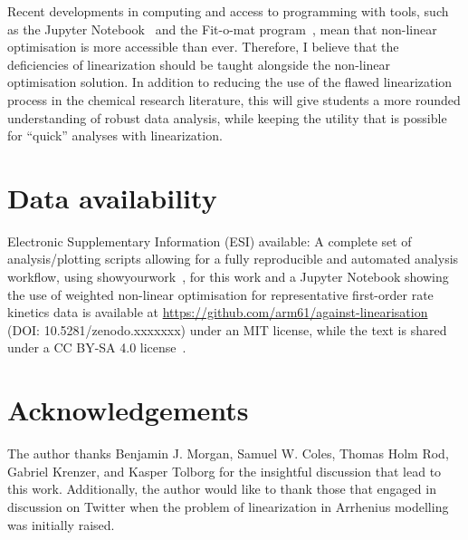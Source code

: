 \documentclass[journal=jceda8,manuscript=article]{achemso}
\begin{document}
Recent developments in computing and access to programming with tools, such as the Jupyter Notebook~\cite{kluyver_jupyter_2016} and the Fit-o-mat program~\cite{mglich_open_2018}, mean that non-linear optimisation is more accessible than ever. 
Therefore, I believe that the deficiencies of linearization should be taught alongside the non-linear optimisation solution. 
In addition to reducing the use of the flawed linearization process in the chemical research literature, this will give students a more rounded understanding of robust data analysis, while keeping the utility that is possible for ``quick'' analyses with linearization.

\section*{Data availability}

Electronic Supplementary Information (ESI) available: A complete set of analysis/plotting scripts allowing for a fully reproducible and automated analysis workflow, using showyourwork~\cite{luger_showyourwork_2021}, for this work and a Jupyter Notebook showing the use of weighted non-linear optimisation for representative first-order rate kinetics data is available at \url{https://github.com/arm61/against-linearisation} (DOI: 10.5281/zenodo.xxxxxxx) under an MIT license, while the text is shared under a CC BY-SA 4.0 license~\cite{mccluskey_github_2023}. \\

\section*{Acknowledgements}

The author thanks Benjamin J. Morgan, Samuel W. Coles, Thomas Holm Rod, Gabriel Krenzer, and Kasper Tolborg for the insightful discussion that lead to this work. 
Additionally, the author would like to thank those that engaged in discussion on Twitter when the problem of linearization in Arrhenius modelling was initially raised. 


\end{document}
